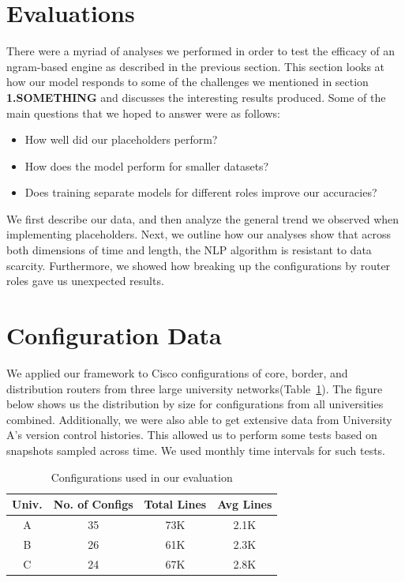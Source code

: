 \section{Evaluations}

There were a myriad of analyses we performed in order to test the efficacy of an ngram-based engine as described in the previous section. This section looks at how our model responds to some of the challenges we mentioned in section \textbf{1.SOMETHING} and discusses the interesting results produced. Some of the main questions that we hoped to answer were as follows: 
\begin{itemize}
  \item How well did our placeholders perform?
  \item How does the model perform for smaller datasets?
  \item Does training separate models for different roles improve our accuracies?
\end{itemize}

 We first describe our data, and then analyze the general trend we observed when implementing placeholders. Next, we outline how our analyses show that across both dimensions of time and length, the NLP algorithm is resistant to data scarcity. Furthermore, we showed how breaking up the configurations by router roles gave us unexpected results.

\section{Configuration Data}

We applied our framework to Cisco configurations of core, border, and distribution routers from three large university networks(Table~\ref{tab:datasets}). The figure below shows us the distribution by size for configurations from all universities combined. Additionally, we were also able to get extensive data from University A's version control histories. This allowed us to perform some tests based on snapshots sampled across time. We used monthly time intervals for such tests.

\begin{table}
    \small \centering
    \begin{tabular}{ | c | c | c | c |}
    \hline
        {\bf Univ.} & {\bf No. of Configs} & {\bf Total Lines} & {\bf Avg
    Lines} \\ 
    \hline
    A & 35 & 73K & 2.1K \\ 
    B & 26 & 61K & 2.3K \\ 
    C & 24 & 67K & 2.8K \\ 
    \hline
    \end{tabular}
    \caption{Configurations used in our evaluation}
    \vspace{-1em}
    \label{tab:datasets}
\end{table}


